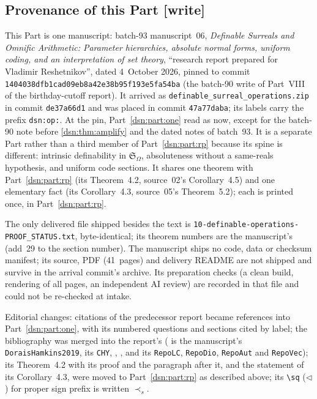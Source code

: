 \documentclass[11pt,a4paper]{article}
\numberwithin{equation}{section}
\theoremstyle{definition}
\theoremstyle{remark}
\newcommand{\ps}{\mathrel{\prec_s}}
\newcommand{\fn}[1]{\nolinkurl{#1}}
\newcommand{\writetag}{\textup{\textsf{\small[write]}}}
\newcommand{\Somega}{\mathfrak S_\Omega}
\begin{document}
\subsection{Provenance of this Part \writetag}
\label{dsn:op:sub:provenance}

This Part is one manuscript: batch-93 manuscript~06, \emph{Definable Surreals
and Omnific Arithmetic: Parameter hierarchies, absolute normal forms, uniform
coding, and an interpretation of set theory}, ``research report prepared for
Vladimir Reshetnikov'', dated 4~October 2026, pinned to commit
\texttt{1404038dfb1cad09eb8a42e38b95f193e5fa54ba} (the batch-90 write of
Part~VIII of the birthday-cutoff report). It arrived as
\fn{definable_surreal_operations.zip} in commit \texttt{de37a66d1} and was
placed in commit \texttt{47a77daba}; its labels carry the prefix
\texttt{dsn:op:}. At the pin, Part~\ref{dsn:part:one} read as now, except
for the batch-90 note before \cref{dsn:thm:amplify} and the dated notes of
batch~93. It is a separate Part rather than a third member of
Part~\ref{dsn:part:rp} because its spine is different: intrinsic definability
in $\Somega$, absoluteness without a same-reals hypothesis, and uniform code
sections. It shares one theorem with Part~\ref{dsn:part:rp} (its Theorem~4.2,
source~02's Corollary~4.5) and one elementary fact (its Corollary~4.3, source~05's
Theorem~5.2); each is printed once, in Part~\ref{dsn:part:rp}.

The only delivered file shipped besides the text is
\fn{10-definable-operations-PROOF_STATUS.txt}, byte-identical; its theorem
numbers are the manuscript's (add~29 to the section number). The manuscript
ships no code, data or checksum manifest; its source, PDF (41~pages) and
delivery README are not shipped and survive in the arrival commit's archive.
Its preparation checks (a clean build, rendering of all pages, an independent
AI review) are recorded in that file and could not be re-checked at intake.

Editorial changes: citations of the predecessor report became references into
Part~\ref{dsn:part:one}, with its numbered questions and sections cited by
label; the bibliography was merged into the report's (\cite{DoraisHamkins} is
the manuscript's \texttt{DoraisHamkins2019}, \cite{CHYKobe} its \texttt{CHY},
\cite{RepoLce}, \cite{RepoOdg}, \cite{RepoOpa} and \cite{RepoRvs} its
\texttt{RepoLC}, \texttt{RepoDio}, \texttt{RepoAut} and \texttt{RepoVec}); its
Theorem~4.2 with its proof and the paragraph after it, and the statement of
its Corollary~4.3, were moved to Part~\ref{dsn:part:rp} as described above;
its \texttt{\textbackslash sq} ($\lhd$) for proper sign prefix is written
$\ps$.
\end{document}
